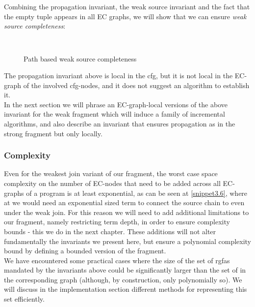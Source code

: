 Combining the propagation invariant, the weak source invariant and the fact that the empty tuple appears in all EC graphs, we will show that we can ensure \emph{weak source completeness}:
\begin{figure}[H]
\\
\caption{Path based weak source completeness}
\label{path_based_weak_source_completeness}
\end{figure}

The propagation invariant above is local in the cfg, but it is not local in the EC-graph of the involved cfg-nodes, 
and it does not suggest an algorithm to establish it.\\
In the next section we will phrase an EC-graph-local versions of the above invariant for the weak fragment which will induce a family of incremental algorithms, and also describe an invariant that ensures propagation as in the strong fragment but only locally.

\subsubsection*{Complexity}
Even for the weakest join variant of our fragment, the worst case space complexity on the number of EC-nodes that need to be added across all EC-graphs of a program is at least exponential, as can be seen at \ref{snippet3.6}, where at  we would need an exponential sized term to connect the source chain  to  even under the weak join.
For this reason we will need to add additional limitations to our fragment, namely restricting term depth, in order to ensure complexity bounds - this we do in the next chapter. 
These additions will not alter fundamentally the invariants we present here, but ensure a polynomial complexity bound by defining a bounded version of the fragment. \\
We have encountered some practical cases where the size of the set of rgfas mandated by the invariants above could be significantly larger than the set of \GFAs{} in the corresponding graph (although, by construction, only polynomially so). 
We will discuss in the implementation section different methods for representing this set efficiently.

